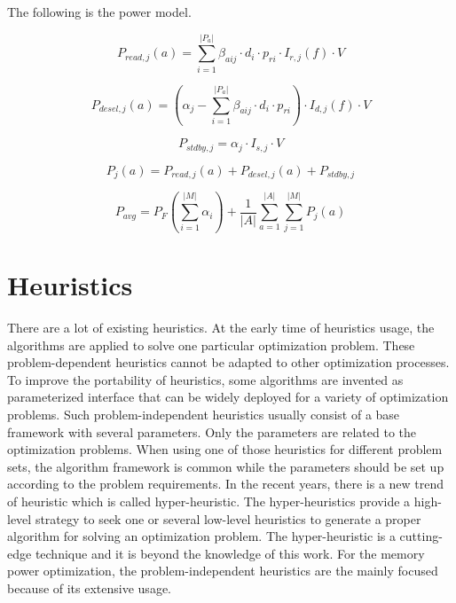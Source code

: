 	The following is the power model.
	
			\begin{equation}
			\label{equa:p_read}
				P_{read,j}\left( a \right) = 
				\sum_{i=1}^{\lvert P_{a} \rvert} \beta_{aij}
				\cdot d_{i} \cdot p_{ri}
				\cdot I_{r,j}\left( f \right) \cdot V
			\end{equation}
			
			\begin{equation}
			\label{equa:p_desel}
				P_{desel,j}\left( a \right) =
				\left( \alpha_{j} - 
				\sum_{i=1}^{\lvert P_{a} \rvert} \beta_{aij}
				\cdot d_{i} \cdot p_{ri}
				\right)
				\cdot I_{d,j}\left( f \right) \cdot V
			\end{equation}
			
			\begin{equation}
			\label{equa:p_stdby}
				P_{stdby,j} =
				\alpha_{j} \cdot I_{s,j} \cdot V
			\end{equation}
			
			\begin{equation}
			\label{equa:p_mem}
				P_{j}\left( a \right) =
				P_{read,j}\left( a \right) +
				P_{desel,j}\left( a \right) +
				P_{stdby,j}
			\end{equation}
			
			\begin{equation}
			\label{equa:p_avg}
				P_{avg} = P_{F}(\sum_{i=1}^{\lvert M \rvert}\alpha_{i}) +
				\frac{1}{\lvert A \rvert}
				\sum_{a=1}^{\lvert A \rvert} \sum_{j=1}^{\lvert M \rvert}
				P_{j}\left( a \right) 
			\end{equation}						
	
	\section{Heuristics}
	\label{sec:heuristics}
	There are a lot of existing heuristics. At the early time of heuristics usage, the algorithms are applied to solve one
	particular optimization problem. These problem-dependent heuristics cannot be adapted to other optimization processes.
	To improve the portability of heuristics, some algorithms are invented as parameterized interface that can be widely
	deployed for a variety of optimization problems. Such problem-independent heuristics usually consist of a base framework
	with several parameters. Only the parameters are related to the optimization problems. When using one of those
	heuristics for different problem sets, the algorithm framework is common while the parameters should be set up according
	to the problem requirements. In the recent years, there is a new trend of heuristic which is called hyper-heuristic.
	The hyper-heuristics provide a high-level strategy to seek one or several low-level heuristics to generate a proper algorithm for solving an optimization problem. The hyper-heuristic is a cutting-edge technique and it is beyond the knowledge of this work. For the memory power optimization, the problem-independent heuristics are the mainly focused
	because of its extensive usage.
	
